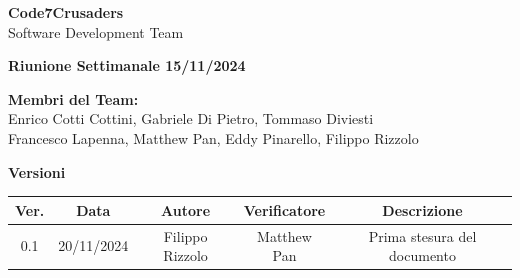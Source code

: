 \documentclass{article}
\begin{document}
\begin{titlepage}
    {\Huge \textbf{Code7Crusaders}}\\
    \vspace{0.5cm}
    {\Large Software Development Team}\\
    \vspace{2cm}
    
    {\large \textbf{Riunione Settimanale 15/11/2024}}\\
    \vspace{5cm}

    \textbf{Membri del Team:}\\
    Enrico Cotti Cottini, Gabriele Di Pietro, Tommaso Diviesti \\
    Francesco Lapenna, Matthew Pan, Eddy Pinarello, Filippo Rizzolo \\
    \vspace{0.5cm}
    
    \vspace{1cm}
\end{titlepage}

\newpage
\begin{table}[h!]
\centering
\textbf{Versioni} \\ %
\vspace{2mm} %
\begin{tabular}{|c|c|c|c|c|}
    \hline
    \textbf{Ver.} & \textbf{Data} & \textbf{Autore} & \textbf{Verificatore} & \textbf{Descrizione} \\
    \hline
    0.1 & 20/11/2024 & Filippo Rizzolo & Matthew Pan & Prima stesura del documento \\ 
    \hline
\end{tabular}
\end{table}

\newpage
\tableofcontents

\newpage
\end{document}
